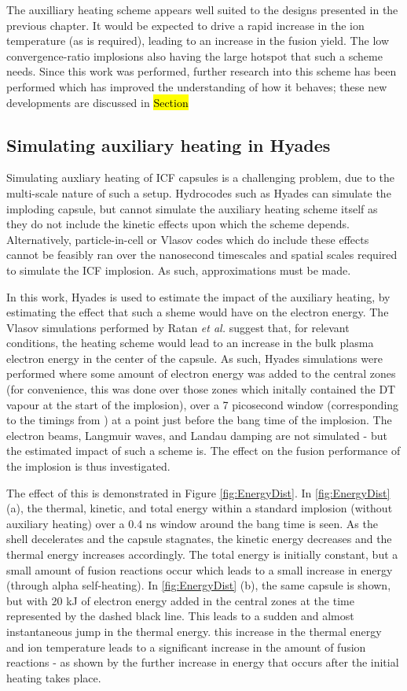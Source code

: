 The auxilliary heating scheme appears well suited to the designs presented in the previous chapter. It would be expected to drive a rapid increase in the ion temperature (as is required), leading to an increase in the fusion yield. The low convergence-ratio implosions also having the large hotspot that such a scheme needs. Since this work was performed, further research into this scheme has been performed which has improved the understanding of how it behaves; these new developments are discussed in \hl{Section}

\subsection{Simulating auxiliary heating in Hyades}

Simulating auxliary heating of ICF capsules is a challenging problem, due to the multi-scale nature of such a setup. Hydrocodes such as Hyades can simulate the imploding capsule, but cannot simulate the auxiliary heating scheme itself as they do not include the kinetic effects upon which the scheme depends. Alternatively, particle-in-cell or Vlasov codes which do include these effects cannot be feasibly ran over the nanosecond timescales and spatial scales required to simulate the ICF implosion. As such, approximations must be made.

In this work, Hyades is used to estimate the impact of the auxiliary heating, by estimating the effect that such a sheme would have on the electron energy. The Vlasov simulations performed by Ratan \textit{et al.} suggest that, for relevant conditions, the heating scheme would lead to an increase in the bulk plasma electron energy in the center of the capsule. As such, Hyades simulations were performed where some amount of electron energy was added to the central zones (for convenience, this was done over those zones which initally contained the DT vapour at the start of the implosion), over a 7 picosecond window (corresponding to the timings from \cite{Ratan2017}) at a point just before the bang time of the implosion. The electron beams, Langmuir waves, and Landau damping are not simulated - but the estimated impact of such a scheme is. The effect on the fusion performance of the implosion is thus investigated.

The effect of this is demonstrated in Figure \ref{fig:EnergyDist}. In \ref{fig:EnergyDist} (a), the thermal, kinetic, and total energy within a standard implosion (without auxiliary heating) over a 0.4 ns window around the bang time is seen. As the shell decelerates and the capsule stagnates, the kinetic energy decreases and the thermal energy increases accordingly. The total energy is initially constant, but a small amount of fusion reactions occur which leads to a small increase in energy (through alpha self-heating). In \ref{fig:EnergyDist} (b), the same capsule is shown, but with 20 kJ of electron energy added in the central zones at the time represented by the dashed black line. This leads to a sudden and almost instantaneous jump in the thermal energy. this increase in the thermal energy and ion temperature leads to a significant increase in the amount of fusion reactions - as shown by the further increase in energy that occurs after the initial heating takes place.

